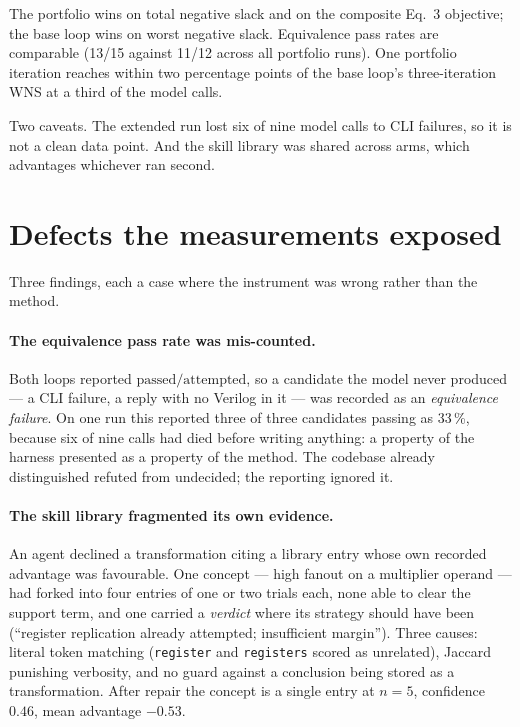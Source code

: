 \documentclass[11pt,a4paper]{article}
\begin{document}
\noindent
The portfolio wins on total negative slack and on the composite Eq.~3
objective; the base loop wins on worst negative slack. Equivalence pass rates
are comparable (13/15 against 11/12 across all portfolio runs). One portfolio
iteration reaches within two percentage points of the base loop's
three-iteration WNS at a third of the model calls.

Two caveats. The extended run lost six of nine model calls to CLI failures, so
it is not a clean data point. And the skill library was shared across arms,
which advantages whichever ran second.

\section{Defects the measurements exposed}

Three findings, each a case where the instrument was wrong rather than the
method.

\paragraph{The equivalence pass rate was mis-counted.}
Both loops reported $\text{passed}/\text{attempted}$, so a candidate the model
never produced --- a CLI failure, a reply with no Verilog in it --- was recorded
as an \emph{equivalence failure}. On one run this reported three of three
candidates passing as 33\,\%, because six of nine calls had died before writing
anything: a property of the harness presented as a property of the method. The
codebase already distinguished refuted from undecided; the reporting ignored it.

\paragraph{The skill library fragmented its own evidence.}
An agent declined a transformation citing a library entry whose own recorded
advantage was favourable. One concept --- high fanout on a multiplier operand
--- had forked into four entries of one or two trials each, none able to clear
the support term, and one carried a \emph{verdict} where its strategy should
have been (``register replication already attempted; insufficient margin'').
Three causes: literal token matching (\texttt{register} and \texttt{registers}
scored as unrelated), Jaccard punishing verbosity, and no guard against a
conclusion being stored as a transformation. After repair the concept is a
single entry at $n=5$, confidence $0.46$, mean advantage $-0.53$.
\end{document}

